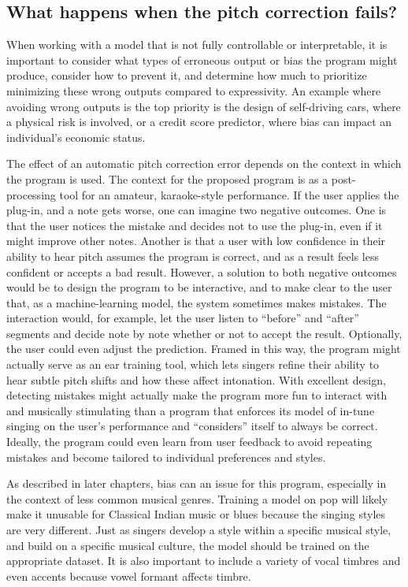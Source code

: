 \subsection{What happens when the pitch correction fails?}
When working with a model that is not fully controllable or interpretable, it is important to consider what types of erroneous output or bias the program might produce, consider how to prevent it, and determine how much to prioritize minimizing these wrong outputs compared to expressivity. An example where avoiding wrong outputs is the top priority is the design of self-driving cars, where a physical risk is involved, or a credit score predictor, where bias can impact an individual's economic status. 

The effect of an automatic pitch correction error depends on the context in which the program is used. The context for the proposed program is as a post-processing tool for an amateur, karaoke-style performance. If the user applies the plug-in, and a note gets worse, one can imagine two negative outcomes. One is that the user notices the mistake and decides not to use the plug-in, even if it might improve other notes. Another is that a user with low confidence in their ability to hear pitch assumes the program is correct, and as a result feels less confident or accepts a bad result. However, a solution to both negative outcomes would be to design the program to be interactive, and to make clear to the user that, as a machine-learning model, the system sometimes makes mistakes. The interaction would, for example, let the user listen to ``before'' and ``after'' segments and decide note by note whether or not to accept the result. Optionally, the user could even adjust the prediction. Framed in this way, the program might actually serve as an ear training tool, which lets singers refine their ability to hear subtle pitch shifts and how these affect intonation. With excellent design, detecting mistakes might actually make the program more fun to interact with and musically stimulating than a program that enforces its model of in-tune singing on the user's performance and ``considers'' itself to always be correct. Ideally, the program could even learn from user feedback to avoid repeating mistakes and become tailored to individual preferences and styles.

As described in later chapters, bias can an issue for this program, especially in the context of less common musical genres. Training a model on pop will likely make it unusable for Classical Indian music or blues because the singing styles are very different. Just as singers develop a style within a specific musical style, and build on a specific musical culture, the model should be trained on the appropriate dataset. It is also important to include a variety of vocal timbres and even accents because vowel formant affects timbre. 

